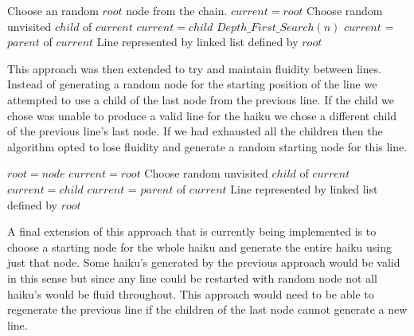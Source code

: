\documentclass[]{article}
\begin{document}
\begin{algorithm}[H]
	\caption{$Depth\_First\_Search(n)$} \label{DFSB}
	\begin{algorithmic}[1]
		\State Choose an random $root$ node from the chain.
		\State $current = root$
				\State Choose random unvisited $child$ of $current$
					\State $current = child$
				\EndIf
			\Else
					\Return $Depth\_First\_Search(n)$
				\Else
					\State $current$ = $parent$ of $current$
				\EndIf
			\EndIf
		\EndWhile
		\Return Line represented by linked list defined by $root$
	\end{algorithmic}
\end{algorithm}

This approach was then extended to try and maintain fluidity between lines. Instead of generating a random node for the starting position of the line we attempted to use a child of the last node from the previous line. If the child we chose was unable to produce a valid line for the haiku we chose a different child of the previous line's last node. If we had exhausted all the children then the algorithm opted to lose fluidity and generate a random starting node for this line.

\begin{algorithm}[H]
	\caption{$Depth\_First\_Search(node, n)$} \label{DFSB_WithStart}
	\begin{algorithmic}[1]
		\State $root = node$
		\State $current = root$
		\State Choose random unvisited $child$ of $current$
		\State $current = child$
		\EndIf
		\Else
		\Else
		\State $current$ = $parent$ of $current$
		\EndIf
		\EndIf
		\EndWhile
		\Return Line represented by linked list defined by $root$
	\end{algorithmic}
\end{algorithm}

A final extension of this approach that is currently being implemented is to choose a starting node for the whole haiku and generate the entire haiku using just that node. Some haiku's generated by the previous approach would be valid in this sense but since any line could be restarted with random node not all haiku's would be fluid throughout. This approach would need to be able to regenerate the previous line if the children of the last node cannot generate a new line.
\end{document}
